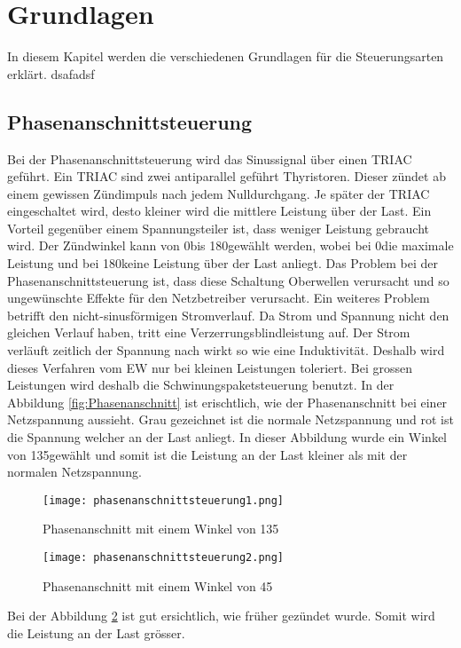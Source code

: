 

\section{Grundlagen}
In diesem Kapitel werden die verschiedenen Grundlagen für die Steuerungsarten erklärt.
dsafadsf
\subsection{Phasenanschnittsteuerung}
Bei der Phasenanschnittsteuerung wird das Sinussignal über einen TRIAC geführt. Ein TRIAC sind zwei antiparallel geführt Thyristoren. Dieser zündet ab einem gewissen Zündimpuls nach jedem Nulldurchgang. Je später der TRIAC eingeschaltet wird, desto kleiner wird die mittlere Leistung über der Last. Ein Vorteil gegenüber einem Spannungsteiler ist, dass weniger Leistung gebraucht wird. Der Zündwinkel kann von 0\textdegree bis 180\textdegree gewählt werden, wobei bei 0\textdegree die maximale Leistung und bei 180\textdegree keine Leistung über der Last anliegt. Das Problem bei der Phasenanschnittsteuerung ist, dass diese Schaltung Oberwellen verursacht und so ungewünschte Effekte für den Netzbetreiber verursacht. Ein weiteres Problem betrifft den nicht-sinusförmigen Stromverlauf. Da Strom und Spannung nicht den gleichen Verlauf haben, tritt eine Verzerrungsblindleistung auf.  Der Strom verläuft zeitlich der Spannung nach wirkt so wie eine Induktivität. Deshalb wird dieses Verfahren vom EW nur bei kleinen Leistungen toleriert. Bei grossen Leistungen wird deshalb die Schwinungspaketsteuerung benutzt. In der Abbildung \ref{fig:Phasenanschnitt} ist erischtlich, wie der Phasenanschnitt bei einer Netzspannung aussieht. Grau gezeichnet ist die normale Netzspannung und rot ist die Spannung welcher an der Last anliegt. In dieser Abbildung wurde ein Winkel von 135\textdegree gewählt und somit ist die Leistung an der Last kleiner als mit der normalen Netzspannung. 

\begin{figure}[ht!]
	\centering
	\texttt{[image: phasenanschnittsteuerung1.png]}	
	\caption{Phasenanschnitt mit einem Winkel von 135\textdegree \cite{Phasenanschnittsteuerung}}\label{fig:Phasenanschnitt1}
\end{figure}
\newpage
\begin{figure}[ht!]
	\centering
	\texttt{[image: phasenanschnittsteuerung2.png]}	
	\caption{Phasenanschnitt mit einem Winkel von 45\textdegree \cite{Phasenanschnittsteuerung}}\label{fig:Phasenanschnitt2}
\end{figure}
Bei der Abbildung \ref{fig:Phasenanschnitt2} ist gut ersichtlich, wie früher gezündet wurde. Somit wird die Leistung an der Last grösser.

